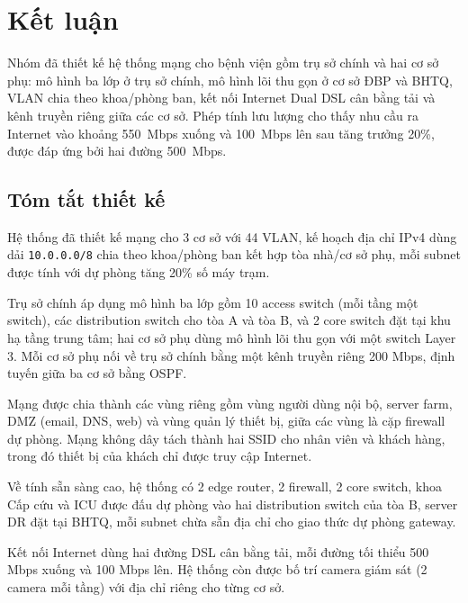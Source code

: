 \section{Kết luận}
Nhóm đã thiết kế hệ thống mạng cho bệnh viện gồm trụ sở chính và hai cơ sở phụ: mô hình ba lớp ở trụ sở chính, mô hình lõi thu gọn ở cơ sở ĐBP và BHTQ, VLAN chia theo khoa/phòng ban, kết nối Internet Dual DSL cân bằng tải và kênh truyền riêng giữa các cơ sở. Phép tính lưu lượng cho thấy nhu cầu ra Internet vào khoảng 550~Mbps xuống và 100~Mbps lên sau tăng trưởng 20\%, được đáp ứng bởi hai đường 500~Mbps.

\subsection{Tóm tắt thiết kế}
Hệ thống đã thiết kế mạng cho 3 cơ sở với 44 VLAN, kế hoạch địa chỉ IPv4 dùng dải \texttt{10.0.0.0/8} chia theo khoa/phòng ban kết hợp tòa nhà/cơ sở phụ, mỗi subnet được tính với dự phòng tăng 20\% số máy trạm.

Trụ sở chính áp dụng mô hình ba lớp gồm 10 access switch (mỗi tầng một switch), các distribution switch cho tòa A và tòa B, và 2 core switch đặt tại khu hạ tầng trung tâm; hai cơ sở phụ dùng mô hình lõi thu gọn với một switch Layer 3. Mỗi cơ sở phụ nối về trụ sở chính bằng một kênh truyền riêng 200 Mbps, định tuyến giữa ba cơ sở bằng OSPF.


Mạng được chia thành các vùng riêng gồm vùng người dùng nội bộ, server farm, DMZ (email, DNS, web) và vùng quản lý thiết bị, giữa các vùng là cặp firewall dự phòng. Mạng không dây tách thành hai SSID cho nhân viên và khách hàng, trong đó thiết bị của khách chỉ được truy cập Internet.

Về tính sẵn sàng cao, hệ thống có 2 edge router, 2 firewall, 2 core switch, khoa Cấp cứu và ICU được đấu dự phòng vào hai distribution switch của tòa B, server DR đặt tại BHTQ, mỗi subnet chừa sẵn địa chỉ cho giao thức dự phòng gateway.

Kết nối Internet dùng hai đường DSL cân bằng tải, mỗi đường tối thiểu 500 Mbps xuống và 100 Mbps lên. Hệ thống còn được bố trí camera giám sát (2 camera mỗi tầng) với địa chỉ riêng cho từng cơ sở.

